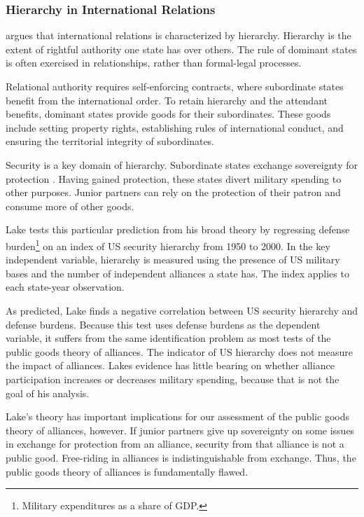 \documentclass[12pt]{article}
\begin{document}
\subsubsection{Hierarchy in International Relations}


\citet{Lake2009} argues that international relations is characterized by hierarchy. 
Hierarchy is the extent of rightful authority one state has over others. 
The rule of dominant states is often exercised in relationships, rather than formal-legal processes. 


Relational authority requires self-enforcing contracts, where subordinate states benefit from the international order. 
To retain hierarchy and the attendant benefits, dominant states provide goods for their subordinates.
These goods include setting property rights, establishing rules of international conduct, and ensuring the territorial integrity of subordinates.


Security is a key domain of hierarchy. 
Subordinate states exchange sovereignty for protection \citep[pg. 140]{Lake2009}.
Having gained protection, these states divert military spending to other purposes. 
Junior partners can rely on the protection of their patron and consume more of other goods. 


Lake tests this particular prediction from his broad theory by regressing defense burden\footnote{Military expenditures as a share of GDP.} on an index of US security hierarchy from 1950 to 2000.
In the key independent variable, hierarchy is measured using the presence of US military bases and the number of independent alliances a state has.
The index applies to each state-year observation.


As predicted, Lake finds a negative correlation between US security hierarchy and defense burdens. 
Because this test uses defense burdens as the dependent variable, it suffers from the same identification problem as most tests of the public goods theory of alliances. 
The indicator of US hierarchy does not measure the impact of alliances. 
Lakes evidence has little bearing on whether alliance participation increases or decreases military spending, because that is not the goal of his analysis. 


Lake's theory has important implications for our assessment of the public goods theory of alliances, however. 
If junior partners give up sovereignty on some issues in exchange for protection from an alliance, security from that alliance is not a public good. 
Free-riding in alliances is indistinguishable from exchange.
Thus, the public goods theory of alliances is fundamentally flawed.  
\end{document}
